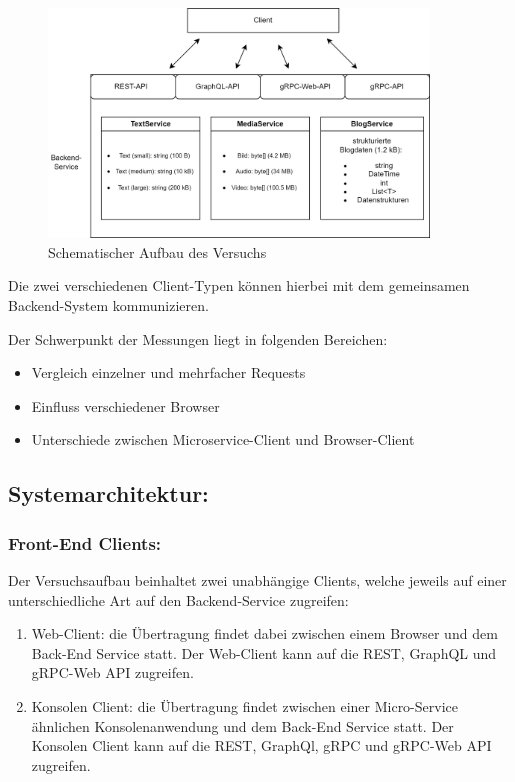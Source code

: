 \begin{figure}[htbp]
	\centering
	\includegraphics[width=0.9\textwidth]{images/BackendService.png}
	\caption{Schematischer Aufbau des Versuchs}
	\label{fig:backendservice}
\end{figure}

Die zwei verschiedenen Client-Typen können hierbei mit dem gemeinsamen Backend-System kommunizieren.

Der Schwerpunkt der Messungen liegt in folgenden Bereichen:

\begin{itemize}
	\item Vergleich einzelner und mehrfacher Requests
	\item Einfluss verschiedener Browser
	\item Unterschiede zwischen Microservice-Client und Browser-Client
\end{itemize}

\subsection*{Systemarchitektur:}

\subsubsection*{Front-End Clients:}
Der Versuchsaufbau beinhaltet zwei unabhängige Clients, welche jeweils auf einer unterschiedliche Art auf den Backend-Service zugreifen:
\begin{enumerate}
	\item Web-Client: die Übertragung findet dabei zwischen einem Browser und dem Back-End Service statt. Der Web-Client kann auf die REST, GraphQL und gRPC-Web API zugreifen.
	\item Konsolen Client: die Übertragung findet zwischen einer Micro-Service ähnlichen Konsolenanwendung und dem Back-End Service statt. Der Konsolen Client kann auf die REST, GraphQl, gRPC und gRPC-Web API zugreifen.
	
\end{enumerate}

